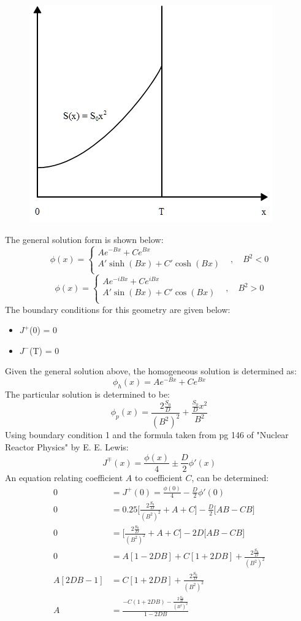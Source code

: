 \documentclass{amsart}
\theoremstyle{definition}
\begin{document}
\begin{figure}[h!]
                \includegraphics[width=.45\linewidth]{P1a.jpg}
\end{figure}
\bigbreak
The general solution form is shown below:
\bigbreak
\[   \phi(x) = \left\{
\begin{array}{ll}
      Ae^{-Bx} + Ce^{Bx} &  \\
      A'\sinh(Bx) + C'\cosh(Bx) &  \\
\end{array}
\right. , \quad B^2 < 0\]
\bigbreak
\[   \phi(x) = \left\{
\begin{array}{ll}
      Ae^{-iBx} + Ce^{iBx} &  \\
      A'\sin(Bx) + C'\cos(Bx) &  \\
\end{array}
\right. , \quad B^2 > 0\]
\bigbreak
The boundary conditions for this geometry are given below:
\begin{itemize}
    \item $J^+$(0) = 0
    \item $J^-$(T) = 0
\end{itemize}
\bigbreak
Given the general solution above, the homogeneous solution is determined as:
\begin{equation*}
    \phi_h(x) = Ae^{-Bx} + Ce^{Bx}
\end{equation*}
The particular solution is determined to be:
\begin{equation*}
    \phi_p(x) = \frac{2\frac{S_0}{D}}{(B^2)^2} + \frac{\frac{S_0}{D}x^2}{B^2}
\end{equation*}
Using boundary condition 1 and the formula taken from pg 146 of "Nuclear Reactor Physics" by E. E. Lewis:
\begin{equation*}
    J^\mp(x) = \frac{\phi(x)}{4} \pm \frac{D}{2} \phi'(x)
\end{equation*}
An equation relating coefficient $A$ to coefficient $C$, can be determined:
\begin{align*}
    0 &= J^+(0) = \frac{\phi(0)}{4} - \frac{D}{2} \phi'(0) \\
     0 &= 0.25\bigg[\frac{2\frac{S_0}{D}}{(B^2)^2}+A+C\bigg] - \frac{D}{2}\bigg[AB-CB\bigg] \\
     0 &= \bigg[\frac{2\frac{S_0}{D}}{(B^2)^2}+A+C\bigg] - 2D\bigg[AB-CB\bigg] \\
     0 &= A[1-2DB] + C[1+2DB]+\frac{2\frac{S_0}{D}}{(B^2)^2} \\
     A[2DB-1] &= C[1+2DB]+\frac{2\frac{S_0}{D}}{(B^2)^2} \\
     A &= \frac{-C(1+2DB)-\frac{2\frac{S_0}{D}}{(B^2)^2}}{1-2DB}
\end{align*}
\end{document}
